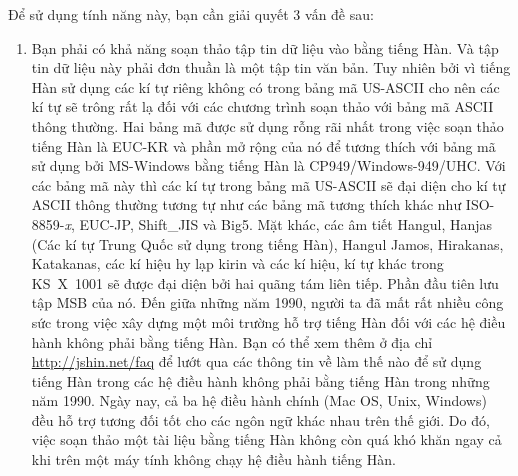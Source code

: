 Để sử dụng tính năng này, bạn cần giải quyết 3 vấn đề sau:
\begin{enumerate}
\item Bạn phải có khả năng soạn thảo tập tin dữ liệu vào bằng
tiếng Hàn. Và tập tin dữ liệu này phải đơn thuần là một tập tin
văn bản. Tuy nhiên bởi vì tiếng Hàn sử dụng các kí tự riêng không
có trong bảng mã US-ASCII cho nên các kí tự sẽ trông rất lạ đối
với các chương trình soạn thảo với bảng mã ASCII thông thường. Hai
bảng mã được sử dụng rỗng rãi nhất trong việc soạn thảo tiếng Hàn
là EUC-KR và phần mở rộng của nó để tương thích với bảng mã sử
dụng bởi MS-Windows bằng tiếng Hàn là CP949/Windows-949/UHC. Với
các bảng mã này thì các kí tự trong bảng mã US-ASCII sẽ đại diện
cho kí tự ASCII thông thường tương tự như các bảng mã tương thích
khác như ISO-8859-\textit{x}, EUC-JP, Shift\_JIS và Big5. Mặt
khác, các âm tiết Hangul, Hanjas (Các kí tự Trung Quốc sử dụng
trong tiếng Hàn), Hangul Jamos, Hirakanas, Katakanas, các kí hiệu
hy lạp kirin và các kí hiệu, kí tự khác trong KS~X~1001 sẽ được
đại diện bởi hai quãng tám liên tiếp. Phần đầu tiên lưu tập MSB
của nó. Đến giữa những năm 1990, người ta đã mất rất nhiều công
sức trong việc xây dựng một môi trường hỗ trợ tiếng Hàn đối với
các hệ điều hành không phải bằng tiếng Hàn. Bạn có thể xem thêm ở
địa chỉ \url{http://jshin.net/faq} để lướt qua các thông tin về
làm thế nào để sử dụng tiếng Hàn trong các hệ điều hành không phải
bằng tiếng Hàn trong những năm 1990. Ngày nay, cả ba hệ điều hành
chính (Mac OS, Unix, Windows) đều hỗ trợ tương đối tốt cho các
ngôn ngữ khác nhau trên thế giới. Do đó, việc soạn thảo một tài
liệu bằng tiếng Hàn không còn quá khó khăn ngay cả khi trên một
máy tính không chạy hệ điều hành tiếng Hàn.


\end{enumerate}
